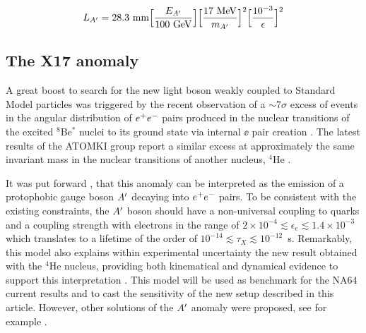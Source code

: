 \begin{eqnarray}
  L_{A'} = 28.3 ~{\rm mm}  \Bigl[\frac{E_{A'}}{100~ {\rm GeV}}\Bigr] 
  \Bigl[\frac{17~ {\rm MeV}}{m_{A'}}\Bigr]^2 \Bigl[\frac{10^{-3}}{\epsilon}\Bigr]^2
  \label{eq:dm-decay-length}
\end{eqnarray}

\subsection{The X17 anomaly}
\label{ch1:sec:dm-u1model-motivations-x17}

A great boost to search for the new light boson weakly coupled to Standard Model particles was triggered by the recent observation of a $\sim$7$\sigma$ excess of events in the angular distribution of $e^+e^-$ pairs produced in the nuclear transitions of the excited $^8$Be$^*$ nuclei to its ground state via internal $\ee$ pair creation \cite{Krasznahorkay:2015iga}. The latest results of the ATOMKI group report a similar excess at approximately the same invariant mass in the nuclear transitions of another nucleus, $^4$He \cite{Krasznahorkay:2019lyl}.

It was put forward  \cite{Feng:2016jff,PhysRevD.95.035017}, that this anomaly can be interpreted as the emission of a protophobic gauge boson $A'$ decaying into $e^+e^-$ pairs. To be consistent with the existing constraints, the $A'$ boson should have a non-universal coupling to quarks and a coupling strength with electrons in the range of $2\times 10^{-4} \lesssim \epsilon_e \lesssim 1.4\times 10^{-3}$ which translates to a lifetime of the order of $10^{-14}\lesssim \tau_X \lesssim 10^{-12}$~s. Remarkably, this model also explains within experimental uncertainty the new result obtained with the $^4$He nucleus, providing both kinematical and dynamical evidence to support this interpretation \cite{Feng:2020mbt}. This model will be used as benchmark for the NA64 current results and to cast the sensitivity of the new setup described in this article. However, other solutions of the $A'$ anomaly were proposed, see for example \cite{Nam:2019osu, Seto:2016pks}.

